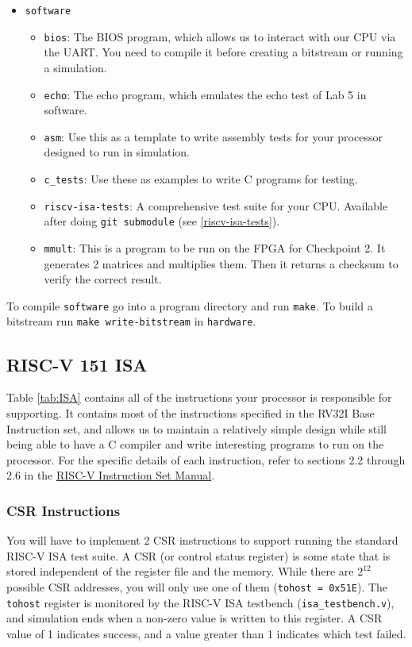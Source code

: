\documentclass[11pt]{article}
\begin{document}
\begin{itemize}
\begin{itemize}
    \end{itemize}
  \item \texttt{software}
    \begin{itemize}
      \item \verb|bios|: The BIOS program, which allows us to interact with our CPU via the UART. You need to compile it before creating a bitstream or running a simulation.
      \item \verb|echo|: The echo program, which emulates the echo test of Lab 5 in software.
      \item \verb|asm|: Use this as a template to write assembly tests for your processor designed to run in simulation.
      \item \verb|c_tests|: Use these as examples to write C programs for testing.
      \item \verb|riscv-isa-tests|: A comprehensive test suite for your CPU. Available after doing \verb|git submodule| (see \ref{riscv-isa-tests}).
      \item \verb|mmult|: This is a program to be run on the FPGA for Checkpoint 2. It generates 2 matrices and multiplies them. Then it returns a checksum to verify the correct result.
    \end{itemize}
\end{itemize}

To compile \texttt{software} go into a program directory and run \texttt{make}.
To build a bitstream run \texttt{make write-bitstream} in \texttt{hardware}.

\subsection{RISC-V 151 ISA}
Table \ref{tab:ISA} contains all of the instructions your processor is responsible for supporting.
It contains most of the instructions specified in the RV32I Base Instruction set, and allows us to maintain a relatively simple design while still being able to have a C compiler and write interesting programs to run on the processor.
For the specific details of each instruction, refer to sections 2.2 through 2.6 in the \href{https://github.com/riscv/riscv-isa-manual/releases/download/Ratified-IMAFDQC/riscv-spec-20191213.pdf}{RISC-V Instruction Set Manual}.

\subsubsection{CSR Instructions}
You will have to implement 2 CSR instructions to support running the standard RISC-V ISA test suite.
A CSR (or control status register) is some state that is stored independent of the register file and the memory.
While there are $2^{12}$ possible CSR addresses, you will only use one of them (\texttt{tohost = 0x51E}).
The \texttt{tohost} register is monitored by the RISC-V ISA testbench (\verb|isa_testbench.v|), and simulation ends when a non-zero value is written to this register.
A CSR value of 1 indicates success, and a value greater than 1 indicates which test failed.
\end{document}
